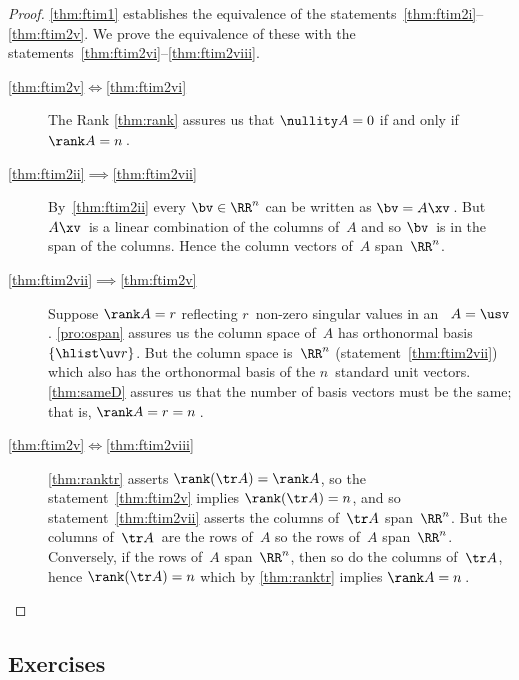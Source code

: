 \begin{proof} 
\autoref{thm:ftim1} establishes the equivalence of the statements~\ref{thm:ftim2i}--\ref{thm:ftim2v}.  
We prove the equivalence of these with the statements~\ref{thm:ftim2vi}--\ref{thm:ftim2viii}.
\begin{description}
\item[\ref{thm:ftim2v}$\iff$\ref{thm:ftim2vi}]
The Rank \autoref{thm:rank} assures us that \(\nullity A=0\) if and only if \(\rank A=n\)\,.
\item[\ref{thm:ftim2ii}$\implies$\ref{thm:ftim2vii}] 
By~\ref{thm:ftim2ii} every \(\bv\in\RR^n\) can be written as \(\bv=A\xv\)\,. But \(A\xv\)~is a linear combination of the columns of~\(A\) and so \(\bv\)~is in the span of the columns.  
Hence the column vectors of~\(A\) span~\(\RR^n\).
\item[\ref{thm:ftim2vii}$\implies$\ref{thm:ftim2v}] 
Suppose \(\rank A=r\) reflecting \(r\)~non-zero singular values in an \svd\ \(A=\usv\).
\autoref{pro:ospan} assures us the column space of~\(A\) has  orthonormal basis~\(\{\hlist\uv r\}\).
But the column space is~\(\RR^n\) (statement~\ref{thm:ftim2vii}) which also has the orthonormal basis of the \(n\)~standard unit vectors.
\autoref{thm:sameD} assures us that the number of basis vectors must be the same; that is, \(\rank A=r=n\)\,.
\item[\ref{thm:ftim2v}$\iff$\ref{thm:ftim2viii}] 
\autoref{thm:ranktr} asserts \(\rank(\tr A)=\rank A\),  so the statement~\ref{thm:ftim2v} implies \(\rank(\tr A)=n\), and so statement~\ref{thm:ftim2vii} asserts the columns of~\(\tr A\) span~\(\RR^n\).
But the columns of~\(\tr A\)\ are the rows of~\(A\) so the rows of~\(A\) span~\(\RR^n\).
Conversely, if the rows of~\(A\) span~\(\RR^n\), then so do the columns of~\(\tr A\), hence \(\rank(\tr A)=n\) which by \autoref{thm:ranktr} implies \(\rank A=n\)\,.
\end{description}
\end{proof}








\subsection{Exercises}



